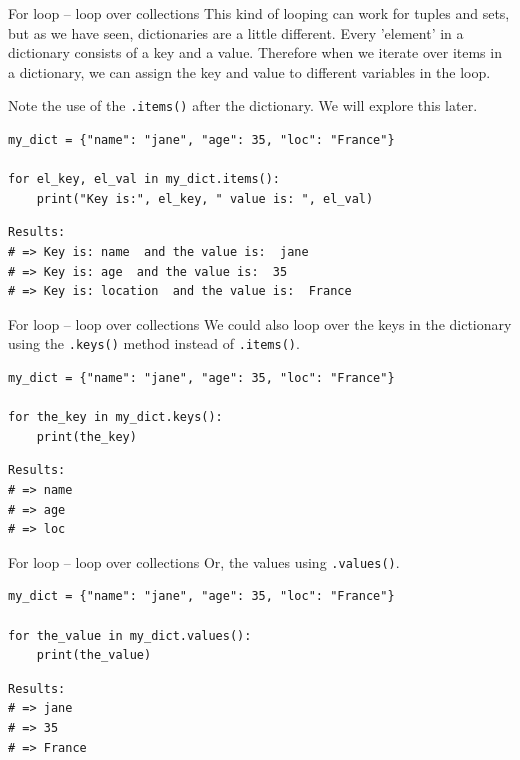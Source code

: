 \documentclass[10pt]{beamer}
\begin{document}
\begin{frame}[label={sec:orgf309efc},fragile]{For loop -- loop over collections}
 This kind of looping can work for tuples and sets, but as we have seen, dictionaries
are a little different. Every 'element' in a dictionary consists of a key and a
value. Therefore when we iterate over items in a dictionary, we can assign the key
and value to different variables in the loop.

\alert{Note} the use of the \texttt{.items()} after the dictionary. We will explore this later.

\begin{verbatim}
my_dict = {"name": "jane", "age": 35, "loc": "France"}

for el_key, el_val in my_dict.items():
    print("Key is:", el_key, " value is: ", el_val)
\end{verbatim}

\begin{verbatim}
Results: 
# => Key is: name  and the value is:  jane
# => Key is: age  and the value is:  35
# => Key is: location  and the value is:  France
\end{verbatim}
\end{frame}

\begin{frame}[label={sec:orgee5e858},fragile]{For loop -- loop over collections}
 We could also loop over the keys in the dictionary using the \texttt{.keys()} method instead
of \texttt{.items()}.

\begin{verbatim}
my_dict = {"name": "jane", "age": 35, "loc": "France"}

for the_key in my_dict.keys():
    print(the_key)
\end{verbatim}

\begin{verbatim}
Results: 
# => name
# => age
# => loc
\end{verbatim}
\end{frame}

\begin{frame}[label={sec:org61a8e22},fragile]{For loop -- loop over collections}
 Or, the values using \texttt{.values()}.

\begin{verbatim}
my_dict = {"name": "jane", "age": 35, "loc": "France"}

for the_value in my_dict.values():
    print(the_value)
\end{verbatim}

\begin{verbatim}
Results: 
# => jane
# => 35
# => France
\end{verbatim}
\end{frame}
\end{document}
